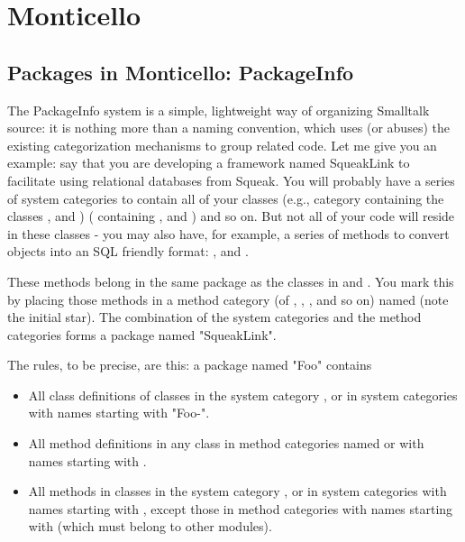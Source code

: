  \chapter{Monticello}

\section{Packages in Monticello: PackageInfo}

The PackageInfo system is a simple, lightweight way of organizing Smalltalk source: it is nothing more than a naming convention, which uses (or abuses) the existing categorization mechanisms to group related code. Let me give you an example: say that you are developing a framework named SqueakLink to facilitate using relational databases from Squeak. You will probably have a series of system categories to contain all of your classes (e.g., category  containing the classes ,  and )
( containing ,   and ) and so on. But not all of your code will reside in these classes - you may also have, for example, a series of methods to convert objects into an SQL friendly format: ,   and  .

These methods belong in the same package as the classes in  and . You mark this by placing those methods in a method category (of , , , and so on) named  (note the initial star). The combination of the  system categories and the  method categories forms a package named "SqueakLink".

The rules, to be precise, are this: a package named "Foo" contains

\begin{itemize}
\item All class definitions of classes in the system category , or in system categories with names starting with "Foo-".
\item All method definitions in any class in method categories named  or with names starting with .
\item All methods in classes in the system category , or in system categories with names starting with , except those in method categories with names starting with \cat{*} (which must belong to other modules).
\end{itemize}

